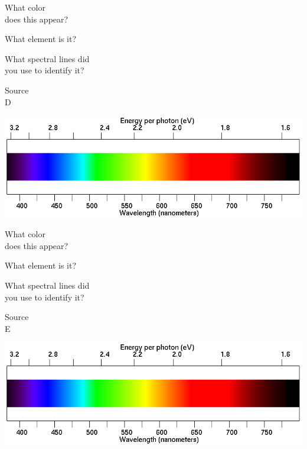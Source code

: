 \documentclass[11pt]{article}
\begin{document}
\begin{minipage}{0.33\textwidth}
	What color \\does this appear?
\end{minipage}
\begin{minipage}{0.33\textwidth}
	What element is it?
\end{minipage}
\begin{minipage}{0.33\textwidth}
	What spectral lines did\\
	you use to identify it?
\end{minipage}

\vspace{1.2in}

\begin{minipage}{0.1\textwidth}
	\begin{center}
		\Large Source \\ D
	\end{center}
\end{minipage}
\begin{minipage}{0.7\textwidth}
	\includegraphics[width=\textwidth]{spectrum2.png}
\end{minipage}

\begin{minipage}{0.33\textwidth}
	What color \\does this appear?
\end{minipage}
\begin{minipage}{0.33\textwidth}
	What element is it?
\end{minipage}
\begin{minipage}{0.33\textwidth}
	What spectral lines did\\
	you use to identify it?
\end{minipage}

\vspace{1.2in}

\begin{minipage}{0.1\textwidth}
	\begin{center}
		\Large Source \\ E
	\end{center}
\end{minipage}
\begin{minipage}{0.7\textwidth}
	\includegraphics[width=\textwidth]{spectrum2.png}
\end{minipage}
\end{document}
